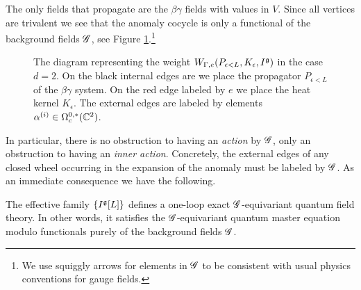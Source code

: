 \documentclass[10pt]{amsart}
\begin{document}
The only fields that propagate are the $\beta\gamma$ fields with values in $V$. 
Since all vertices are trivalent we see that the anomaly cocycle is only a functional of the background fields $\mathscr G$, see Figure \ref{fig:liewheel}.\footnote{We use squiggly arrows for elements in $\mathscr G$ to be consistent with usual physics conventions for gauge fields.}

\begin{figure}
\begin{center}
\caption{The diagram representing the weight $W_{\Gamma, e}(P_{\epsilon<L}, K_\epsilon, I^\mathfrak g)$ in the case $d=2$. 
On the black internal edges are we place the propagator $P_{\epsilon < L}$ of the $\beta\gamma$ system. 
On the red edge labeled by $e$ we place the heat kernel $K_\epsilon$.
The external edges are labeled by elements $\alpha^{(i)} \in \Omega^{0,*}_c(\mathbb C^2)$.}
\label{fig:liewheel}
\end{center}
\end{figure}

In particular, there is no obstruction to having an {\em action} by $\mathscr G$, only an obstruction to having an {\em inner action}. 
Concretely, the external edges of any closed wheel occurring in the expansion of the anomaly must be labeled by $\mathscr G$. 
As an immediate consequence we have the following.

\begin{lem}
The effective family $\{I^{\mathfrak g}[L]\}$ defines a one-loop exact $\mathscr G$-equivariant quantum field theory.
In other words, it satisfies the $\mathscr G$-equivariant quantum master equation modulo functionals purely of the background fields $\mathscr G$. 
\end{lem}
\end{document}

